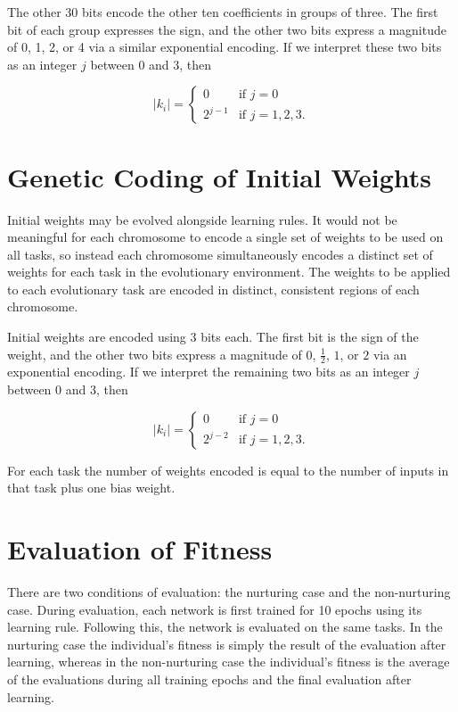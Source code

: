 \documentclass[master]{outhesis}
\begin{document}
The other 30 bits encode the other ten coefficients in groups of three. The first bit of each group expresses the sign, and the other two bits express a magnitude of 0, 1, 2, or 4 via a similar exponential encoding. If we interpret these two bits as an integer $j$ between 0 and 3, then

\[
	|k_i|=
	\begin{cases}
		0 & \text{if $j = 0$}\\
		2^{j-1} & \text{if $j = 1, 2, 3$.}
	\end{cases}
\]

\section{Genetic Coding of Initial Weights}

Initial weights may be evolved alongside learning rules. It would not be meaningful for each chromosome to encode a single set of weights to be used on all tasks, so instead each chromosome simultaneously encodes a distinct set of weights for each task in the evolutionary environment. The weights to be applied to each evolutionary task are encoded in distinct, consistent regions of each chromosome. 

\newcommand{\bitsperweight}{3}
\newcommand{\jlen}{2}
\newcommand{\jmin}{0}
\newcommand{\jmax}{3}
\newcommand{\exponentshift}{4}

Initial weights are encoded using 3 bits each. The first bit is the sign of the weight, and the other two bits express a magnitude of 0, $\frac{1}{2}$, $1$, or $2$ via an exponential encoding. If we interpret the remaining two bits as an integer $j$ between 0 and 3, then

\[
	|k_i|=
	\begin{cases}
		0 & \text{if $j = 0$}\\
		2^{j-2} & \text{if $j = 1, 2, 3$.}
	\end{cases}
\]

For each task the number of weights encoded is equal to the number of inputs in that task plus one bias weight.

\section{Evaluation of Fitness}

There are two conditions of evaluation: the nurturing case and the non-nurturing case. During evaluation, each network is first trained for 10 epochs using its learning rule. Following this, the network is evaluated on the same tasks. In the nurturing case the individual's fitness is simply the result of the evaluation after learning, whereas in the non-nurturing case the individual's fitness is the average of the evaluations during all training epochs and the final evaluation after learning.
\end{document}
